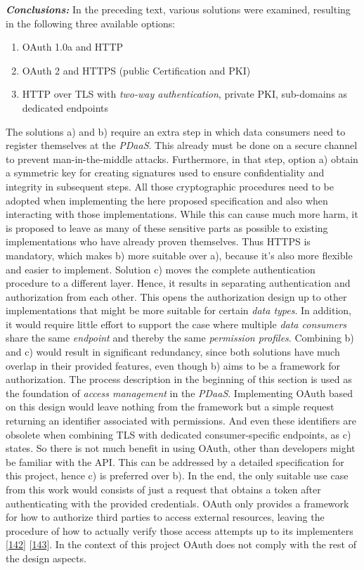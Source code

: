 \documentclass[12pt,english,a4paper,titlepage,cleardoublepage=empty,dottedtoc]{report}
\providecommand{\tightlist}{%
  \setlength{\itemsep}{0pt}\setlength{\parskip}{0pt}}
\begin{document}
\emph{\textbf{Conclusions:}} In the preceding text, various solutions
were examined, resulting in the following three available options:

\begin{enumerate}
\def\labelenumi{\alph{enumi})}
\tightlist
\item
  OAuth 1.0a and HTTP
\item
  OAuth 2 and HTTPS (public Certification and PKI)
\item
  HTTP over TLS with \emph{two-way authentication}, private PKI,
  sub-domains as dedicated endpoints
\end{enumerate}

The solutions a) and b) require an extra step in which data consumers
need to register themselves at the \emph{PDaaS}. This already must be
done on a secure channel to prevent man-in-the-middle attacks.
Furthermore, in that step, option a) obtain a symmetric key for creating
signatures used to ensure confidentiality and integrity in subsequent
steps. All those cryptographic procedures need to be adopted when
implementing the here proposed specification and also when interacting
with those implementations. While this can cause much more harm, it is
proposed to leave as many of these sensitive parts as possible to
existing implementations who have already proven themselves. Thus HTTPS
is mandatory, which makes b) more suitable over a), because it's also
more flexible and easier to implement. Solution c) moves the complete
authentication procedure to a different layer. Hence, it results in
separating authentication and authorization from each other. This opens
the authorization design up to other implementations that might be more
suitable for certain \emph{data types}. In addition, it would require
little effort to support the case where multiple \emph{data consumers}
share the same \emph{endpoint} and thereby the same \emph{permission
profiles}. Combining b) and c) would result in significant redundancy,
since both solutions have much overlap in their provided features, even
though b) aims to be a framework for authorization. The process
description in the beginning of this section is used as the foundation
of \emph{access management} in the \emph{PDaaS}. Implementing OAuth
based on this design would leave nothing from the framework but a simple
request returning an identifier associated with permissions. And even
these identifiers are obsolete when combining TLS with dedicated
consumer-specific endpoints, as c) states. So there is not much benefit
in using OAuth, other than developers might be familiar with the API.
This can be addressed by a detailed specification for this project,
hence c) is preferred over b). In the end, the only suitable use case
from this work would consists of just a request that obtains a token
after authenticating with the provided credentials. OAuth only provides
a framework for how to authorize third parties to access external
resources, leaving the procedure of how to actually verify those access
attempts up to its implementers
{[}\protect\hyperlink{ref-web_spec_oauth-1a_access-verification}{142}{]}
{[}\protect\hyperlink{ref-web_spec_oauth-2_access-verification}{143}{]}.
In the context of this project OAuth does not comply with the rest of
the design aspects.
\end{document}
